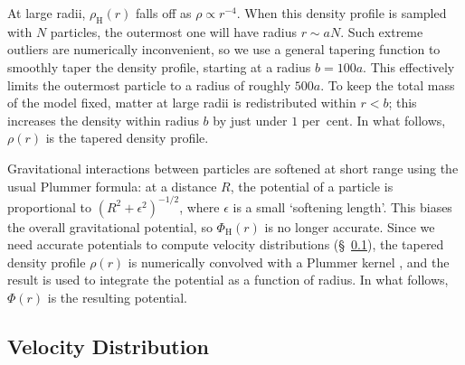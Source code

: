 \documentclass[fleqn,usenatbib]{mnras}
\begin{document}
At large radii, $\rho_\mathrm{H}(r)$ falls off as $\rho \propto r^{-4}$. When this density profile is sampled with $N$ particles, the outermost one will have radius $r \sim a N$. Such extreme outliers are numerically inconvenient, so we use a general tapering function \citep[eq.~16]{Barnes2012} to smoothly taper the density profile, starting at a radius $b = 100 a$. This effectively limits the outermost particle to a radius of roughly $500 a$. To keep the total mass of the model fixed, matter at large radii is redistributed within $r < b$; this increases the density within radius $b$ by just under $1$ per~cent. In what follows, $\rho(r)$ is the tapered density profile.

Gravitational interactions between particles are softened at short range using the usual Plummer formula: at a distance $R$, the potential of a particle is proportional to $(R^2 + \epsilon^2)^{-1/2}$, where $\epsilon$ is a small `softening length'. This biases the overall gravitational potential, so $\Phi_\mathrm{H}(r)$ is no longer accurate. Since we need accurate potentials to compute velocity distributions (\S~\ref{sec:velocity_distribution}), the tapered density profile $\rho(r)$ is numerically convolved with a Plummer kernel \citep[eq.~6]{Barnes2012}, and the result is used to integrate the potential as a function of radius. In what follows, $\Phi(r)$ is the resulting potential.

\subsection{Velocity Distribution}
\label{sec:velocity_distribution}
\end{document}
